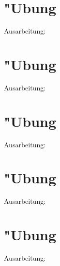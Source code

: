 \documentclass[a4paper,11pt,titlepage]{article}
\begin{document}
\section{"Ubung}
Ausarbeitung:
\newpage
\section{"Ubung}
Ausarbeitung:
\newpage
\section{"Ubung}
Ausarbeitung:
\newpage
\section{"Ubung}
Ausarbeitung:
\newpage
\section{"Ubung}
Ausarbeitung:

\end{document}
